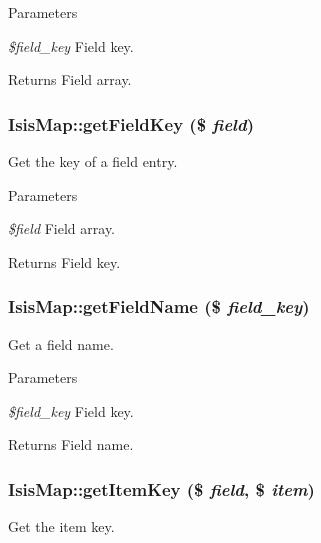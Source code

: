 \begin{DoxyParams}{Parameters}
\item[{\em \$field\_\-key}]Field key.\end{DoxyParams}
\begin{DoxyReturn}{Returns}
Field array. 
\end{DoxyReturn}
\hypertarget{classIsisMap_ac6a4eed048ddfa62c76e6d813754af81}{
\subsubsection[{getFieldKey}]{\setlength{\rightskip}{0pt plus 5cm}IsisMap::getFieldKey (\$ {\em field})}}
\label{classIsisMap_ac6a4eed048ddfa62c76e6d813754af81}
Get the key of a field entry.


\begin{DoxyParams}{Parameters}
\item[{\em \$field}]Field array.\end{DoxyParams}
\begin{DoxyReturn}{Returns}
Field key. 
\end{DoxyReturn}
\hypertarget{classIsisMap_ae41313537e399f15ff16a4db887cf5b9}{
\subsubsection[{getFieldName}]{\setlength{\rightskip}{0pt plus 5cm}IsisMap::getFieldName (\$ {\em field\_\-key})}}
\label{classIsisMap_ae41313537e399f15ff16a4db887cf5b9}
Get a field name.


\begin{DoxyParams}{Parameters}
\item[{\em \$field\_\-key}]Field key.\end{DoxyParams}
\begin{DoxyReturn}{Returns}
Field name. 
\end{DoxyReturn}
\hypertarget{classIsisMap_a994934784caa4149737bda55160a459f}{
\subsubsection[{getItemKey}]{\setlength{\rightskip}{0pt plus 5cm}IsisMap::getItemKey (\$ {\em field}, \/  \$ {\em item})}}
\label{classIsisMap_a994934784caa4149737bda55160a459f}
Get the item key.


